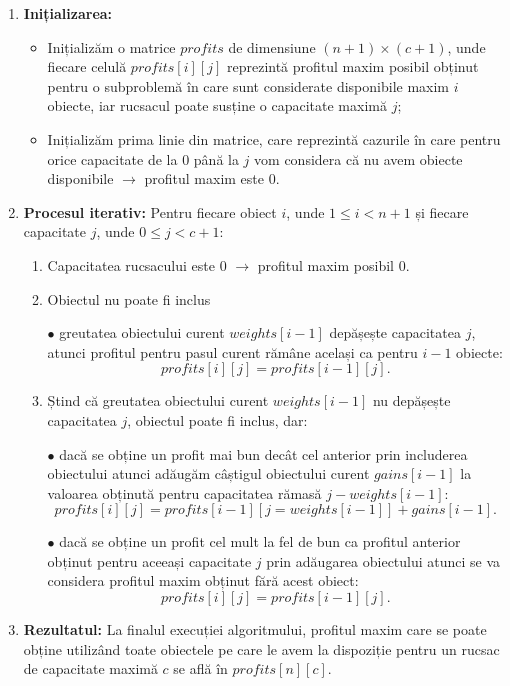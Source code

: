 \begin{sloppypar}
\begin{tcolorbox}[mystyle]
\begin{enumerate}[left=0.2em]
    \item \textbf{Inițializarea:}
    \begin{itemize}
        \item Inițializăm o matrice \(profits\) de dimensiune \((n + 1) \times (c + 1)\), unde fiecare celulă \( profits[i][j]\) reprezintă profitul maxim posibil obținut pentru o subproblemă în care sunt considerate disponibile maxim \(i\) obiecte, iar rucsacul poate susține o capacitate maximă \(j\);
        \item Inițializăm prima linie din matrice, care reprezintă cazurile în care pentru orice capacitate de la 0 până la \(j\) vom considera că nu avem obiecte disponibile $\rightarrow$ profitul maxim este 0.
    \end{itemize}
    \item \textbf{Procesul iterativ:}
    Pentru fiecare obiect \(i\), unde $1 \le i < n + 1$ și fiecare capacitate \(j\), unde $0 \le j < c + 1$:
    \begin{enumerate}
        \item Capacitatea rucsacului este 0 $\rightarrow$ profitul maxim posibil 0.
        \item Obiectul nu poate fi inclus \par
            $\bullet$ greutatea obiectului curent \(weights[i - 1]\) depășește capacitatea \(j\), atunci profitul pentru pasul curent rămâne același ca pentru \(i - 1\) obiecte: \[profits[i][j] = profits[i - 1][j].\]
        \item Ștind că greutatea obiectului curent \(weights[i - 1]\) nu depășește capacitatea \(j\), obiectul poate fi inclus, dar: \par
        $\bullet$ dacă se obține un profit mai bun decât cel anterior prin includerea obiectului atunci adăugăm câștigul obiectului curent \(gains[i - 1]\) la valoarea obținută pentru capacitatea rămasă \(j - weights[i - 1]\): \[profits[i][j] = profits[i - 1][j = weights[i - 1]] + gains[i - 1].\] \par
        $\bullet$ dacă se obține un profit cel mult la fel de bun ca profitul anterior obținut pentru aceeași capacitate \(j\) prin adăugarea obiectului atunci se va considera profitul maxim obținut fără acest obiect: \[profits[i][j] = profits[i - 1][j].\] 
    \end{enumerate}
    \item \textbf{Rezultatul:}
    La finalul execuției algoritmului, profitul maxim care se poate obține utilizând toate obiectele pe care le avem la dispoziție pentru un rucsac de capacitate maximă \(c\) se află în \(profits[n][c]\).
\end{enumerate}
\end{tcolorbox}


\end{sloppypar}
